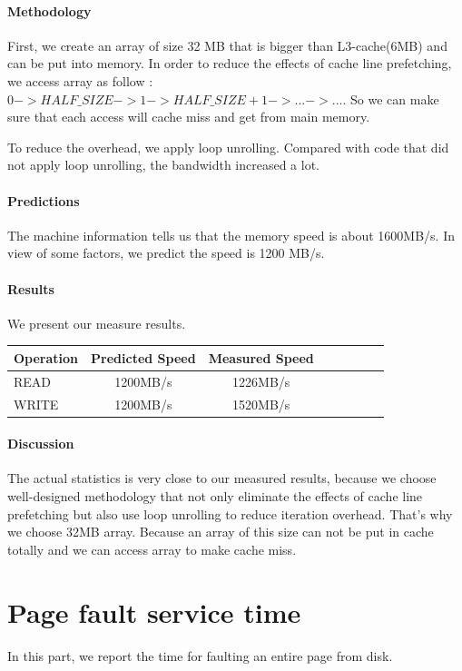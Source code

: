 \paragraph{Methodology}
First, we create an array of size 32 MB that is bigger than L3-cache(6MB) and can be put into memory. In order to reduce the effects of cache line prefetching, we access array as follow : $0 -> HALF\_SIZE -> 1 -> HALF\_SIZE+1 -> ... -> ...$. So we can make sure that each access will cache miss and get from main memory.

To reduce the overhead, we apply loop unrolling. Compared with code that did not apply loop unrolling, the bandwidth increased  a lot.

\paragraph{Predictions}
The machine information tells us that the memory speed is about 1600MB/s. In view of some factors, we predict the speed is 1200 MB/s.

\paragraph{Results}
We present our measure results.

\begin{center}
\begin{tabular}{l*{6}{c}r}
Operation             & Predicted Speed & Measured Speed  \\
\hline
READ & 1200MB/s & 1226MB/s \\
WRITE & 1200MB/s & 1520MB/s \\

\end{tabular}
\end{center}

\paragraph{Discussion}
The actual statistics is very close to our measured results, because we choose well-designed methodology that not only eliminate the effects of cache line prefetching but also use loop unrolling to reduce iteration overhead. That's why we choose 32MB array. Because an array of this size can not be put in cache totally and we can access array to make cache miss.

\section{Page fault service time}
In this part, we report the time for faulting an entire page from disk.

